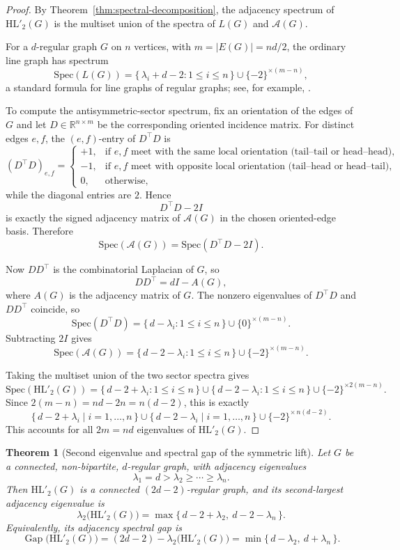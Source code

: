 \documentclass[11pt]{article}
\newcommand{\Spec}{\mathrm{Spec}}
\newtheorem{theorem}{Theorem}
\newcommand{\HL}{\mathrm{HL}}
\theoremstyle{plain}
\DeclareMathOperator{\Gap}{Gap}
\begin{document}
\begin{proof}
By Theorem~\ref{thm:spectral-decomposition}, the adjacency spectrum of $\HL'_2(G)$ is the multiset union
of the spectra of $L(G)$ and $\mathcal A(G)$.

For a $d$-regular graph $G$ on $n$ vertices, with $m=|E(G)|=nd/2$, the ordinary line graph has spectrum
\[
\Spec(L(G))
=
\{\, \lambda_i+d-2 : 1\le i\le n \,\}
\cup
\{-2\}^{\times (m-n)},
\]
a standard formula for line graphs of regular graphs; see, for example, \cite{godsil2001algebraic}.

To compute the antisymmetric-sector spectrum, fix an orientation of the edges of $G$ and let
$D\in\mathbb R^{n\times m}$ be the corresponding oriented incidence matrix. For distinct edges $e,f$,
the $(e,f)$-entry of $D^\top D$ is
\[
(D^\top D)_{e,f}=
\begin{cases}
+1,& \text{if } e,f \text{ meet with the same local orientation (tail--tail or head--head)},\\
-1,& \text{if } e,f \text{ meet with opposite local orientation (tail--head or head--tail)},\\
0,& \text{otherwise},
\end{cases}
\]
while the diagonal entries are \(2\). Hence
\[
D^\top D-2I
\]
is exactly the signed adjacency matrix of \(\mathcal A(G)\) in the chosen oriented-edge basis. Therefore
\[
\Spec(\mathcal A(G))=\Spec(D^\top D-2I).
\]

Now \(DD^\top\) is the combinatorial Laplacian of \(G\), so
\[
DD^\top = dI-A(G),
\]
where \(A(G)\) is the adjacency matrix of \(G\). The nonzero eigenvalues of \(D^\top D\) and \(DD^\top\)
coincide, so
\[
\Spec(D^\top D)
=
\{\, d-\lambda_i : 1\le i\le n \,\}
\cup
\{0\}^{\times (m-n)}.
\]
Subtracting \(2I\) gives
\[
\Spec(\mathcal A(G))
=
\{\, d-2-\lambda_i : 1\le i\le n \,\}
\cup
\{-2\}^{\times (m-n)}.
\]

Taking the multiset union of the two sector spectra gives
\[
\Spec(\HL'_2(G))
=
\{\, d-2+\lambda_i : 1\le i\le n \,\}
\cup
\{\, d-2-\lambda_i : 1\le i\le n \,\}
\cup
\{-2\}^{\times 2(m-n)}.
\]
Since \(2(m-n)=nd-2n=n(d-2)\), this is exactly
\[
\{\, d - 2 + \lambda_i \mid i=1,\dots,n \,\}
\cup
\{\, d - 2 - \lambda_i \mid i=1,\dots,n \,\}
\cup
\{-2\}^{\times\, n(d-2)}.
\]
This accounts for all \(2m=nd\) eigenvalues of \(\HL'_2(G)\).
\end{proof}

\begin{theorem}[Second eigenvalue and spectral gap of the symmetric lift]\label{thm:lift-second-eigenvalue}
Let \(G\) be a connected, non-bipartite, \(d\)-regular graph, with adjacency eigenvalues
\[
\lambda_1=d>\lambda_2\ge \cdots \ge \lambda_n.
\]
Then \(\HL'_2(G)\) is a connected \((2d-2)\)-regular graph, and its second-largest adjacency eigenvalue is
\[
\lambda_2\!\big(\HL'_2(G)\big)
=
\max\{\,d-2+\lambda_2,\ d-2-\lambda_n\,\}.
\]
Equivalently, its adjacency spectral gap is
\[
\Gap\!\big(\HL'_2(G)\big)
=
(2d-2)-\lambda_2\!\big(\HL'_2(G)\big)
=
\min\{\,d-\lambda_2,\ d+\lambda_n\,\}.
\]
\end{theorem}
\end{document}
